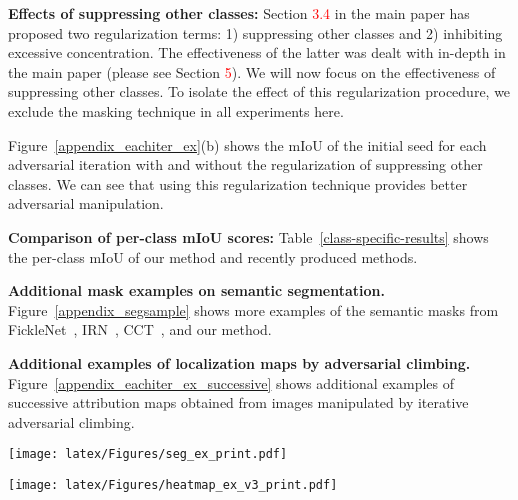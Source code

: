 \documentclass[final]{cvpr}
\begin{document}
\textbf{Effects of suppressing other classes:} Section \textcolor{red}{3.4} in the main paper has proposed two regularization terms: 1) suppressing other classes and 2) inhibiting excessive concentration.
The effectiveness of the latter was dealt with in-depth in the main paper (please see Section \textcolor{red}{5}). We will now focus on the effectiveness of suppressing other classes.
To isolate the effect of this regularization procedure, we exclude the masking technique in all experiments here.


Figure~\ref{appendix_eachiter_ex}(b) shows the mIoU of the initial seed for each adversarial iteration with and without the regularization of suppressing other classes. We can see that using this regularization technique provides better adversarial manipulation.



\textbf{Comparison of per-class mIoU scores:}
Table~\ref{class-specific-results} shows the per-class mIoU of our method and recently produced methods.








\textbf{Additional mask examples on semantic segmentation.}
Figure~\ref{appendix_segsample} shows more examples of the semantic masks from FickleNet~\cite{lee2019ficklenet}, IRN~\cite{ahn2019weakly}, CCT~\cite{ouali2020semi}, and our method.



\textbf{Additional examples of localization maps by adversarial climbing.}
Figure~\ref{appendix_eachiter_ex_successive} shows additional examples of successive attribution maps obtained from images manipulated by iterative adversarial climbing.




\begin{figure*}[t]
\centering
\texttt{[image: latex/Figures/seg\_ex\_print.pdf]}
\caption{\label{appendix_segsample} Examples of predicted semantic masks for PASCAL VOC \textit{val} images in weakly and semi-superivsed manner.}
\end{figure*}
 \begin{figure*}[t]
\centering
\texttt{[image: latex/Figures/heatmap\_ex\_v3\_print.pdf]}
\caption{\label{appendix_eachiter_ex_successive} Examples of initial CAMs and successive localization maps obtained from images manipulated by iterative adversarial climbing.}
\end{figure*}
 
\end{document}
